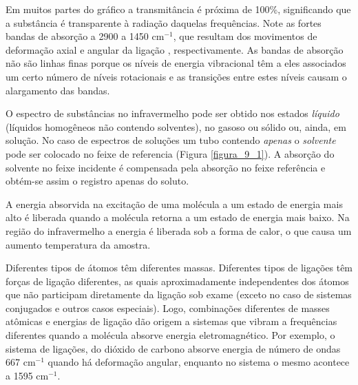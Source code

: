Em muitos partes do gráfico a transmitância é próxima de 100\%, significando que a substância é transparente à radiação daquelas frequências. Note as fortes bandas de absorção a 2900 a 1450 cm$^{-1}$, que resultam dos movimentos de deformação axial e angular da ligação , respectivamente. As bandas de absorção não são linhas finas porque os níveis de energia vibracional têm a eles associados um certo número de níveis rotacionais e as transições entre estes níveis causam o alargamento das bandas.

O espectro de substâncias no infravermelho pode ser obtido nos estados \textit{líquido} (líquidos homogêneos não contendo solventes), no gasoso ou sólido ou, ainda, em solução. No caso de espectros de soluções um tubo contendo \textit{apenas} o \textit{solvente} pode ser colocado no feixe de referencia (Figura \ref{figura_9_1}). A absorção do solvente no feixe incidente é compensada pela absorção no feixe referência e obtém-se assim o registro apenas do soluto.

A energia absorvida na excitação de uma molécula a um estado de energia mais alto é liberada quando a molécula retorna a um estado de energia mais baixo. Na região do infravermelho a energia é liberada sob a forma de calor, o que causa um aumento temperatura da amostra.

Diferentes tipos de átomos têm diferentes massas. Diferentes tipos de ligações têm forças de ligação diferentes, as quais aproximadamente independentes dos átomos que não participam diretamente da ligação sob exame (exceto no caso de sistemas conjugados e outros casos especiais). Logo, combinações diferentes de masses atômicas e energias de ligação dão origem a sistemas que vibram a frequências diferentes quando a molécula absorve energia eletromagnético. Por exemplo, o sistema de ligações,  do dióxido de carbono absorve energia de número de ondas 667 cm$^{-1}$ quando há deformação angular, enquanto no sistema  o mesmo acontece a 1595 cm$^{-1}$.

\begin{figure}[H]
    \centering
    \chemnameinit{}
    \chemnameinit{}
    \qquad\qquad\qquad\qquad
    \chemnameinit{}
\end{figure}

